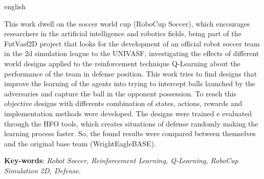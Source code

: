 \begin{resumo}[Abstract]
\begin{otherlanguage*}{english}

	This work dwell on the soccer world cup (RoboCup Soccer), which encourages
	researchers in the artificial intelligence and robotics fields, being part
	of the FutVasf2D project that looks for the development of an official robot
	soccer team in the 2d simulation league to the UNIVASF, investigating the
	effects of different world designs applied to the reinforcement technique
	Q-Learning about the performance of the team in defense position. This work
	tries to find designs that improve the learning of the agents into trying to
	intercept balls launched by the adversaries and capture the ball in the
	opponent possession. To reach this objective designs with differents
	combination of states, actions, rewards and implementation methods were
	developed. The designs were trained e evaluated through the HFO tools, which
	creates situations of defense randomly making the learning process faster.
	So, the found results were compared between themselves and the original base
	team (WrightEagleBASE).
	
	\vspace{\onelineskip}

	\noindent
	\textbf{Key-words}: \textit{Robot Soccer, Reinforcement Learning, Q-Learning, RoboCup Simulation 2D, Defense}.

\end{otherlanguage*}
\end{resumo}


\begin{KeepFromToc} %
\listoffigures
\cleardoublepage


\listoftables
\cleardoublepage

\makeatletter
\let\l@listing\l@figure
\def\newfloat@listoflisting@hook{\let\figurename\listingname}
\makeatother

\listoflistings

\end{KeepFromToc}

